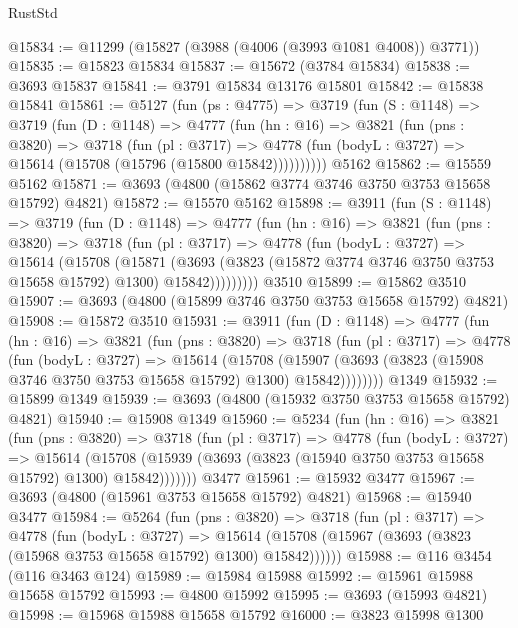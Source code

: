 \begin{lexlean}{RustStd}
\begin{coremodule}
@15834 := @11299 (@15827 (@3988 (@4006 (@3993 @1081 @4008)) @3771))
@15835 := @15823 @15834
@15837 := @15672 (@3784 @15834)
@15838 := @3693 @15837
@15841 := @3791 @15834 @13176 @15801
@15842 := @15838 @15841
@15861 := @5127
    (fun (ps : @4775) =>
    @3719
      (fun (S : @1148) =>
      @3719
        (fun (D : @1148) =>
        @4777
          (fun (hn : @16) =>
          @3821
            (fun (pns : @3820) =>
            @3718
              (fun (pl : @3717) =>
              @4778 (fun (bodyL : @3727) => @15614 (@15708 (@15796 (@15800 @15842))))))))))
    @5162
@15862 := @15559 @5162
@15871 := @3693 (@4800 (@15862 @3774 @3746 @3750 @3753 @15658 @15792) @4821)
@15872 := @15570 @5162
@15898 := @3911
    (fun (S : @1148) =>
    @3719
      (fun (D : @1148) =>
      @4777
        (fun (hn : @16) =>
        @3821
          (fun (pns : @3820) =>
          @3718
            (fun (pl : @3717) =>
            @4778
              (fun (bodyL : @3727) =>
              @15614
                (@15708
                  (@15871
                    (@3693
                      (@3823 (@15872 @3774 @3746 @3750 @3753 @15658 @15792) @1300)
                      @15842)))))))))
    @3510
@15899 := @15862 @3510
@15907 := @3693 (@4800 (@15899 @3746 @3750 @3753 @15658 @15792) @4821)
@15908 := @15872 @3510
@15931 := @3911
    (fun (D : @1148) =>
    @4777
      (fun (hn : @16) =>
      @3821
        (fun (pns : @3820) =>
        @3718
          (fun (pl : @3717) =>
          @4778
            (fun (bodyL : @3727) =>
            @15614
              (@15708
                (@15907 (@3693 (@3823 (@15908 @3746 @3750 @3753 @15658 @15792) @1300) @15842))))))))
    @1349
@15932 := @15899 @1349
@15939 := @3693 (@4800 (@15932 @3750 @3753 @15658 @15792) @4821)
@15940 := @15908 @1349
@15960 := @5234
    (fun (hn : @16) =>
    @3821
      (fun (pns : @3820) =>
      @3718
        (fun (pl : @3717) =>
        @4778
          (fun (bodyL : @3727) =>
          @15614
            (@15708 (@15939 (@3693 (@3823 (@15940 @3750 @3753 @15658 @15792) @1300) @15842)))))))
    @3477
@15961 := @15932 @3477
@15967 := @3693 (@4800 (@15961 @3753 @15658 @15792) @4821)
@15968 := @15940 @3477
@15984 := @5264
    (fun (pns : @3820) =>
    @3718
      (fun (pl : @3717) =>
      @4778
        (fun (bodyL : @3727) =>
        @15614 (@15708 (@15967 (@3693 (@3823 (@15968 @3753 @15658 @15792) @1300) @15842))))))
@15988 := @116 @3454 (@116 @3463 @124)
@15989 := @15984 @15988
@15992 := @15961 @15988 @15658 @15792
@15993 := @4800 @15992
@15995 := @3693 (@15993 @4821)
@15998 := @15968 @15988 @15658 @15792
@16000 := @3823 @15998 @1300

\end{coremodule}
\end{lexlean}
